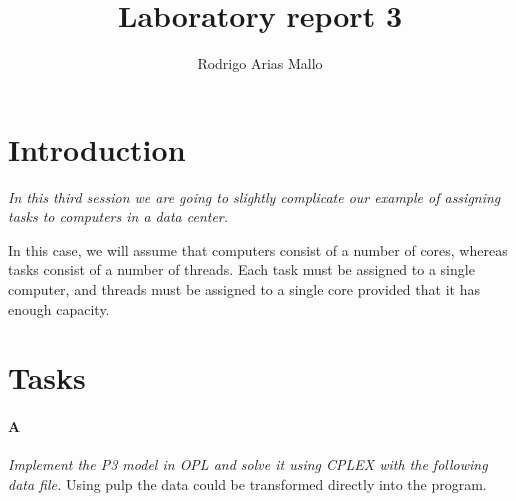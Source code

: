 \documentclass[11pt,a4paper]{article}
\title{Laboratory report 3}
\author{Rodrigo Arias Mallo}
\begin{document}
\maketitle

\section*{Introduction}
{\sl In this third session we are going to slightly complicate our example of 
assigning tasks to computers in a data center.

In this case, we will assume that computers consist of a number of cores, 
whereas tasks consist of a number of threads. Each task must be assigned to a 
single computer, and threads must be assigned to a single core provided that it
has enough capacity.}

\section*{Tasks}
\paragraph*{A}
{\sl Implement the P3 model in OPL and solve it using CPLEX with the following 
data file.}
%
Using pulp the data could be transformed directly into the program.
\end{document}
